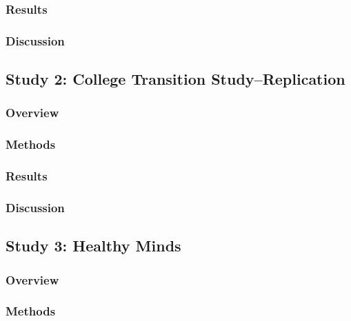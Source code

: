 \documentclass[10pt,letterpaper]{article}
\begin{document}
\hypertarget{results}{%
\subsubsection{Results}\label{results}}

\hypertarget{discussion}{%
\subsubsection{Discussion}\label{discussion}}

\hypertarget{study-2-college-transition-studyreplication}{%
\subsection{Study 2: College Transition
Study--Replication}\label{study-2-college-transition-studyreplication}}

\hypertarget{overview}{%
\subsubsection{Overview}\label{overview}}

\hypertarget{methods}{%
\subsubsection{Methods}\label{methods}}

\hypertarget{results-1}{%
\subsubsection{Results}\label{results-1}}

\hypertarget{discussion-1}{%
\subsubsection{Discussion}\label{discussion-1}}

\hypertarget{study-3-healthy-minds}{%
\subsection{Study 3: Healthy Minds}\label{study-3-healthy-minds}}

\hypertarget{overview-1}{%
\subsubsection{Overview}\label{overview-1}}

\hypertarget{methods-1}{%
\subsubsection{Methods}\label{methods-1}}
\end{document}
